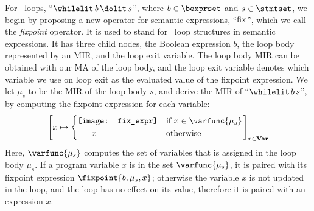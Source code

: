 For \whilelit~loops, ``$\whilelit\, b\, \dolit\, s$'', where $b \in \bexprset$
and $s \in \stmtset$, we begin by proposing a new operator for semantic
expressions, ``$\operatorname{\mathrm{fix}}$'', which we call the \emph{fixpoint} operator.  It is
used to stand for \whilelit~loop structures in semantic expressions.  It has
three child nodes, the Boolean expression $b$, the loop body represented by an
MIR, and the loop exit variable.  The loop body MIR can be obtained with our MA
of the loop body, and the loop exit variable denotes which variable we use on
loop exit as the evaluated value of the fixpoint expression.  We let $\mu_s$ to
be the MIR of the loop body $s$, and derive the MIR of ``$\whilelit\, b\, s$'',
by computing the fixpoint expression for each variable:
\begin{equation}
    \left[
        x \mapsto \left\{
            \begin{aligned}
                & \begin{aligned}
                    \texttt{[image: fix\_expr]}
                \end{aligned} && \text{if~} x \in \varfunc{\mu_s} \\
                & \quad ~ ~ x && \text{otherwise}
            \end{aligned}
        \right.
    \right]_{x \in \varset}
    \label{eq:mir_while}
\end{equation}
Here, $\varfunc{\mu_s}$ computes the set of variables that is assigned in the
loop body $\mu_s$.  If a program variable $x$ is in the set $\varfunc{\mu_s}$,
it is paired with its fixpoint expression $\fixpoint{b, \mu_s, x}$; otherwise
the variable $x$ is not updated in the loop, and the loop has no effect on its
value, therefore it is paired with an expression $x$.
